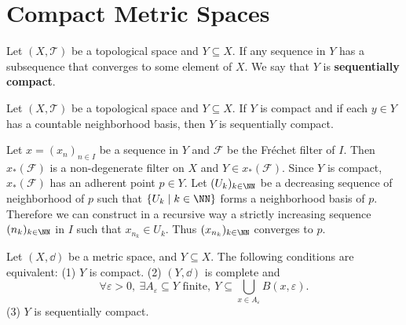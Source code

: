 \newpage
\section{Compact Metric Spaces}
\begin{definitionenv}
    Let $(X,\mathscr{T})$ be a topological space and $Y\subseteq X$. If any sequence in $Y$ has a subsequence that converges to some element of $X$. We say that $Y$ is \textbf{sequentially compact}.
\end{definitionenv}
\begin{theoremenv}
    Let $(X,\mathscr{T})$ be a topological space and $Y\subseteq X$. If $Y$ is compact and if each $y\in Y$ has a countable neighborhood basis, then $Y$ is sequentially compact.
\end{theoremenv}
\begin{proofenv}
    Let $x=(x_n)_{n\in I}$ be a sequence in $Y$ and $\mathcal{F}$ be the Fréchet filter of $I$. Then $x_*(\mathcal{F})$ is a non-degenerate filter on $X$ and $Y\in x_*(\mathcal{F})$. Since $Y$ is compact, $x_*(\mathcal{F})$ has an adherent point $p\in Y$. Let $(U_k)_{k\in \NN}$ be a decreasing sequence of neighborhood of $p$ such that $\{U_k\mid k\in \NN\}$ forms a neighborhood basis of $p$. Therefore we can construct in a recursive way  a strictly increasing sequence $(n_k)_{k\in \NN} $ in $I$ such that $x_{n_k}\in U_k$. Thus $(x_{n_k})_{k\in \NN}$ converges to $p$.
\end{proofenv}
\begin{theoremenv}
    Let $(X,\dd)$ be a metric space, and $Y\subseteq X$. The following conditions are equivalent:
    \newline
    (1) $Y$ is compact.
    \newline
    (2) $(Y,\dd)$ is complete and
    $$\forall \varepsilon>0,\ \exists A_\varepsilon\subseteq Y\text{ finite},\ Y\subseteq \bigcup_{x\in A_\varepsilon}B(x,\varepsilon).  $$
    \newline
    (3) $Y$ is sequentially compact.
\end{theoremenv}
